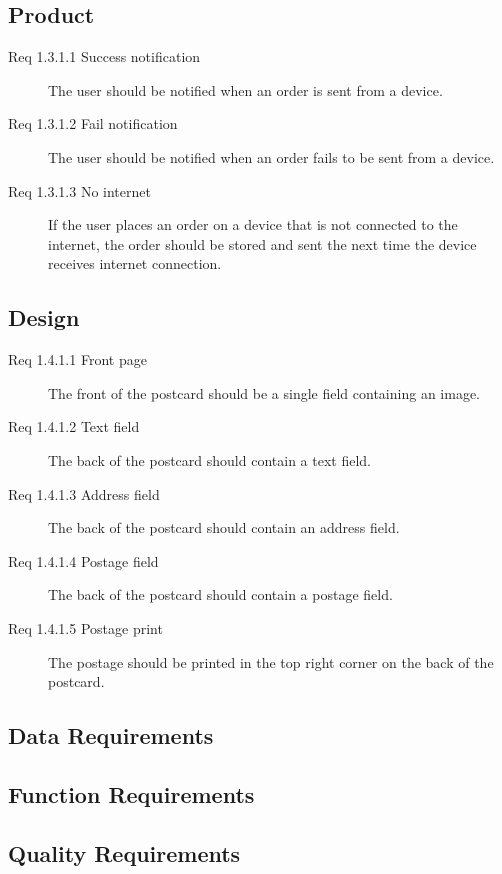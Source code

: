 \documentclass[10pt,a4paper]{article}
\begin{document}
\subsection{Product}
\begin{description}
\item [Req 1.3.1.1 Success notification]The user should be notified when an order is sent from a device.
\item [Req 1.3.1.2 Fail notification] The user should be notified when an order fails to be sent from a device.

\item [Req 1.3.1.3 No internet] If the user places an order on a device that is not connected to the internet, the order should be stored and sent the next time the device receives internet connection. 

\end{description}


\subsection{Design}
\begin {description}
\item[Req 1.4.1.1 Front page] The front of the postcard should be a single field containing an image.
\item [Req 1.4.1.2 Text field] The back of the postcard should contain a text field.
\item [Req 1.4.1.3 Address field] The back of the postcard should contain an address field.
\item [Req 1.4.1.4 Postage field] The back of the postcard should contain a postage field. 
\item [Req 1.4.1.5 Postage print] The postage should be printed in the top right corner on the back of the postcard. 
\end{description}
\subsection{Data Requirements}
\subsection{Function Requirements}
\subsection{Quality Requirements}

\end{document}
